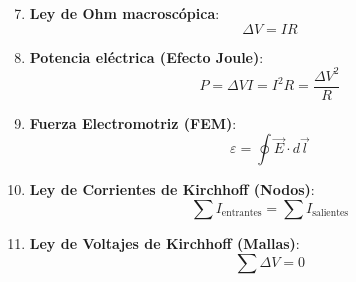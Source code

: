 \documentclass[letterpaper, 12pt]{article}
\newenvironment{kitpropiedades}[1]{%
    \begin{tcolorbox}[colback=celesteSuave, colframe=azulFuerte, title=\textbf{#1}, fonttitle=\bfseries]
}{%
    \end{tcolorbox}
}
\begin{document}
\vspace{0.4cm}

\begin{kitpropiedades}{FORMULARIO DE CIRCUITOS: LEY DE OHM Y KIRCHHOFF}
\begin{enumerate}[label=\textbf{\arabic*.}, leftmargin=*, itemsep=0.4cm]
    \setcounter{enumi}{6} %

    \item \textbf{Ley de Ohm macroscópica}:
    $$\Delta V = I R$$

    \item \textbf{Potencia eléctrica (Efecto Joule)}:
    $$P = \Delta V I = I^2 R = \frac{\Delta V^2}{R}$$

    \item \textbf{Fuerza Electromotriz (FEM)}:
    $$\varepsilon = \oint \vec{E} \cdot d\vec{l}$$

    \item \textbf{Ley de Corrientes de Kirchhoff (Nodos)}:
    $$\sum I_{\text{entrantes}} = \sum I_{\text{salientes}}$$

    \item \textbf{Ley de Voltajes de Kirchhoff (Mallas)}:
    $$\sum \Delta V = 0$$

\end{enumerate}
\end{kitpropiedades}

\vspace{0.4cm}
\end{document}
